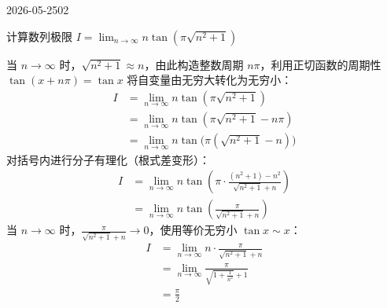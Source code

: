 \begin{mistake}{2026-05-25}{02}

\begin{problemcontent}
计算数列极限 \(I = \lim_{n \to \infty} n \tan(\pi \sqrt{n^2 + 1})\)
\end{problemcontent}

\begin{solutioncontent}
当 \(n \to \infty\) 时，\(\sqrt{n^2+1} \approx n\)，由此构造整数周期 \(n\pi\)，利用正切函数的周期性 \(\tan(x + n\pi) = \tan x\) 将自变量由无穷大转化为无穷小：
\[
\begin{aligned}
I &= \lim_{n \to \infty} n \tan(\pi \sqrt{n^2 + 1}) \\
&= \lim_{n \to \infty} n \tan(\pi \sqrt{n^2 + 1} - n\pi) \\
&= \lim_{n \to \infty} n \tan\Big( \pi(\sqrt{n^2 + 1} - n) \Big) 
\end{aligned}
\]
对括号内进行分子有理化（根式差变形）：
\[
\begin{aligned}
I &= \lim_{n \to \infty} n \tan\left( \pi \cdot \frac{(n^2 + 1) - n^2}{\sqrt{n^2 + 1} + n} \right) \\
&= \lim_{n \to \infty} n \tan\left( \frac{\pi}{\sqrt{n^2 + 1} + n} \right)
\end{aligned}
\]
当 \(n \to \infty\) 时，\(\frac{\pi}{\sqrt{n^2 + 1} + n} \to 0\)，使用等价无穷小 \(\tan x \sim x\)：
\[
\begin{aligned}
I &= \lim_{n \to \infty} n \cdot \frac{\pi}{\sqrt{n^2 + 1} + n} \\
&= \lim_{n \to \infty} \frac{\pi}{\sqrt{1 + \frac{1}{n^2}} + 1} \\
&= \frac{\pi}{2}
\end{aligned}
\]
\end{solutioncontent}


\end{mistake}
